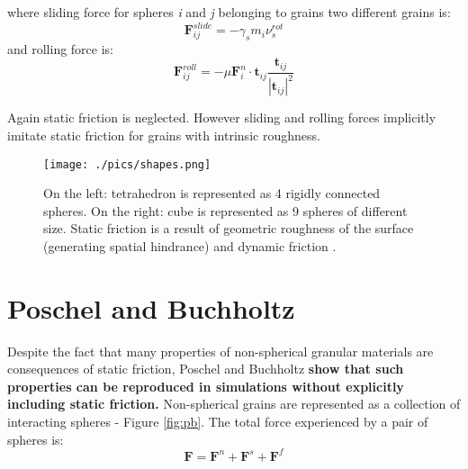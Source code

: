 \documentclass[10pt,a4paper]{article}
\begin{document}
where sliding force for spheres \textit{i} and \textit{j} belonging to grains two different grains is: %
\begin{equation}
 \mathbf{F}^{slide}_{ij} = -\gamma_s m_i \nu^{rot}_s
\end{equation}
and rolling force is:
\begin{equation}
 \mathbf{F}^{roll}_{ij} = -\mu\mathbf{F}^{n}_{i} \cdot \mathbf{t}_{ij} \frac{ \mathbf{t}_{ij}} { |\mathbf{t}_{ij}|^2 }
\end{equation}

Again static friction is neglected. %
However sliding and rolling forces implicitly imitate static friction for grains with intrinsic roughness.

\begin{figure}[tb]
\centering
\texttt{[image: ./pics/shapes.png]}
\caption{On the left: tetrahedron is represented as 4 rigidly connected spheres. On the right: cube is represented as 9 spheres of different size.
Static friction is a result of geometric roughness of the surface (generating spatial hindrance) and dynamic friction \cite{sok93, mucha05}.}
\label{fig:shapes}
\end{figure}

\section{Poschel and Buchholtz \cite{pb93, pb94, pb95}}
Despite the fact that many properties of non-spherical granular materials are consequences of static friction,
Poschel and Buchholtz \textbf{show that such properties can be reproduced in simulations without explicitly including static friction.}
Non-spherical grains are represented as a collection of interacting spheres - Figure \ref{fig:pb}. 
The total force experienced by a pair of spheres is:
\begin{equation}
 \mathbf{F} = \mathbf{F}^{n} + \mathbf{F}^{s} + \mathbf{F}^{f}
\end{equation}
\end{document}

